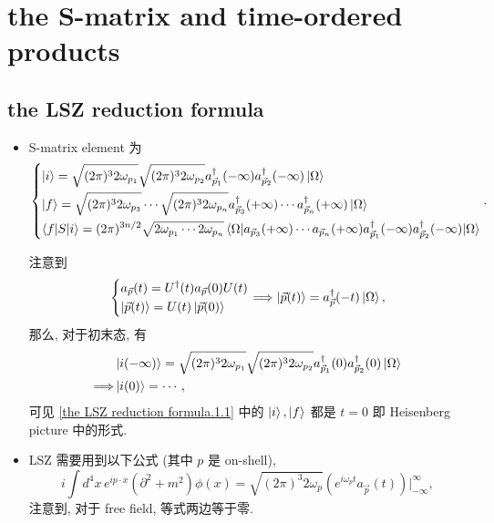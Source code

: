 \chapter{the S-matrix and time-ordered products}
\section{the LSZ reduction formula}
\begin{itemize}
	\item S-matrix element 为
	\begin{equation}\label{the LSZ reduction formula.1.1}
		\begin{dcases}
			\ket{i} = \sqrt{(2 \pi)^3 2 \omega_{p_1}} \sqrt{(2 \pi)^3 2 \omega_{p_2}} a^\dag_{\vec{p}_1}(- \infty) a^\dag_{\vec{p}_2}(- \infty) \ket{\Omega} \\
			\ket{f} = \sqrt{(2 \pi)^3 2 \omega_{p_3}} \cdots \sqrt{(2 \pi)^3 2 \omega_{p_n}} a^\dag_{\vec{p}_3}(+ \infty) \cdots a^\dag_{\vec{p}_n}(+ \infty) \ket{\Omega} \\
			\braket{f | S | i} = (2 \pi)^{3 n / 2} \sqrt{2 \omega_{p_1} \cdots 2 \omega_{p_n}} \braket{\Omega | a_{\vec{p}_3}(+ \infty) \cdots a_{\vec{p}_n}(+ \infty) a^\dag_{\vec{p}_1}(- \infty) a^\dag_{\vec{p}_2}(- \infty) | \Omega}
		\end{dcases}.
	\end{equation}
	
	\begin{tcolorbox}[title=remark:]
		注意到
		\begin{equation}
			\begin{dcases}
				a_{\vec{p}}(t) = U^\dag(t) a_{\vec{p}}(0) U(t) \\
				\ket{\vec{p}(t)} = U(t) \ket{\vec{p}(0)}
			\end{dcases} \Longrightarrow \ket{\vec{p}(t)} = a^\dag_{\vec{p}}(- t) \ket{\Omega},
		\end{equation}
		那么, 对于初末态, 有
		\begin{align}
			& \ket{i(- \infty)} = \sqrt{(2 \pi)^3 2 \omega_{p_1}} \sqrt{(2 \pi)^3 2 \omega_{p_2}} a^\dag_{\vec{p}_1}(0) a^\dag_{\vec{p}_2}(0) \ket{\Omega} \notag \\
			\Longrightarrow & \ket{i(0)} = \cdots,
		\end{align}
		可见 \eqref{the LSZ reduction formula.1.1} 中的 $\ket{i}, \ket{f}$ 都是 $t = 0$ 即 Heisenberg picture 中的形式.
	\end{tcolorbox}
	
	\item LSZ 需要用到以下公式 (其中 $p$ 是 on-shell),
	\begin{equation}
		i \int d^4 x \, e^{i p \cdot x} (\partial^2 + m^2) \phi(x) = \sqrt{(2 \pi)^3 2 \omega_p} (e^{i \omega_p t} a_{\vec{p}}(t)) \Big|^\infty_{- \infty},
	\end{equation}
	注意到, 对于 free field, 等式两边等于零.
	

\end{itemize}
